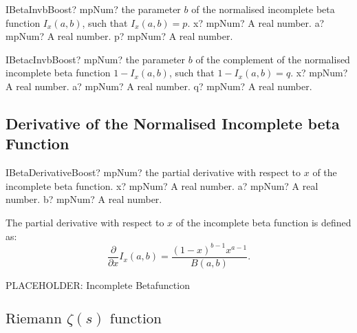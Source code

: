\vspace{0.6cm}
\begin{mpFunctionsExtract}
	\mpFunctionThree
	{IBetaInvbBoost? mpNum? the parameter $b$ of the normalised incomplete beta function $I_x(a,b)$, such that $I_x(a,b) = p$.}
	{x? mpNum? A real number.}
	{a? mpNum? A real number.}
	{p? mpNum? A real number.}
\end{mpFunctionsExtract}


\vspace{0.6cm}
\begin{mpFunctionsExtract}
	\mpFunctionThree
	{IBetacInvbBoost? mpNum? the parameter $b$ of the complement of the normalised incomplete beta function $1-I_x(a,b)$, such that $1-I_x(a,b) = q$.}
	{x? mpNum? A real number.}
	{a? mpNum? A real number.}
	{q? mpNum? A real number.}
\end{mpFunctionsExtract}





\subsection{Derivative of the Normalised Incomplete beta Function}
\label{sec:DerivativeNormalisedIncompleteBetaFunction}

\begin{mpFunctionsExtract}
	\mpFunctionThree
	{IBetaDerivativeBoost? mpNum? the partial derivative with respect to $x$ of the incomplete beta function.}
	{x? mpNum? A real number.}
	{a? mpNum? A real number.}
	{b? mpNum? A real number.}
\end{mpFunctionsExtract}

\vspace{0.3cm}
The partial derivative with respect to $x$ of the incomplete beta function is defined as:
\begin{equation}
	\frac{\partial}{\partial x}I_x(a,b) = \frac{(1-x)^{b-1} x^{a-1}}{B(a,b)}.
\end{equation}






PLACEHOLDER: Incomplete Betafunction

\label{sec:IncompleteBetaFunction}


\subsection{\texorpdfstring{$\text{Riemann }\zeta(s)\text{ function}$}{RiemannZeta}}
\label{RiemannZeta}


